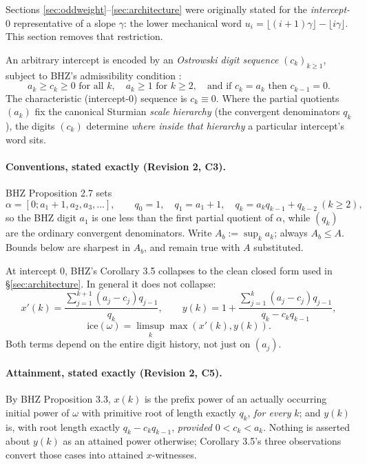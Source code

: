 \documentclass[11pt]{article}
\begin{document}
Sections \ref{sec:oddweight}--\ref{sec:architecture} were originally stated for the
\emph{intercept-$0$} representative of a slope $\gamma$: the lower mechanical word
$u_i=\lfloor(i+1)\gamma\rfloor-\lfloor i\gamma\rfloor$. This section removes that restriction.

An arbitrary intercept is encoded by an \emph{Ostrowski digit sequence} $(c_k)_{k\ge1}$, subject to
BHZ's admissibility condition \cite{BHZ2006}:
\[
a_k \ge c_k \ge 0 \text{ for all } k,\quad a_k\ge1 \text{ for } k\ge2,\quad \text{and if } c_k=a_k \text{ then } c_{k-1}=0.
\]
The characteristic (intercept-$0$) sequence is $c_k\equiv0$. Where the partial quotients $(a_k)$ fix
the canonical Sturmian \emph{scale hierarchy} (the convergent denominators $q_k$), the digits
$(c_k)$ determine \emph{where inside that hierarchy} a particular intercept's word sits.

\paragraph{Conventions, stated exactly (Revision 2, C3).} BHZ Proposition 2.7 sets
\[
\alpha=[0;a_1+1,a_2,a_3,\dots],\qquad q_0=1,\quad q_1=a_1+1,\quad q_k=a_kq_{k-1}+q_{k-2}\ (k\ge2),
\]
so the BHZ digit $a_1$ is one less than the first partial quotient of $\alpha$, while $(q_k)$ are
the ordinary convergent denominators. Write $A_b:=\sup_k a_k$; always $A_b\le A$. Bounds below are
sharpest in $A_b$, and remain true with $A$ substituted.

At intercept $0$, BHZ's Corollary 3.5 collapses to the clean closed form used in
\S\ref{sec:architecture}. In general it does not collapse:
\[
x'(k) = \frac{\sum_{j=1}^{k+1}(a_j-c_j)q_{j-1}}{q_k}, \qquad
y(k) = 1 + \frac{\sum_{j=1}^{k}(a_j-c_j)q_{j-1}}{q_k-c_kq_{k-1}},
\]
\[
\text{ice}(\omega)=\limsup_k \max(x'(k),y(k)).
\]
Both terms depend on the entire digit history, not just on $(a_j)$.

\paragraph{Attainment, stated exactly (Revision 2, C5).} By BHZ Proposition 3.3, $x(k)$ is the
prefix power of an actually occurring initial power of $\omega$ with primitive root of length
exactly $q_k$, \emph{for every} $k$; and $y(k)$ is, with root length exactly $q_k-c_kq_{k-1}$,
\emph{provided} $0<c_k<a_k$. Nothing is asserted about $y(k)$ as an attained power otherwise;
Corollary 3.5's three observations convert those cases into attained $x$-witnesses.
\end{document}
